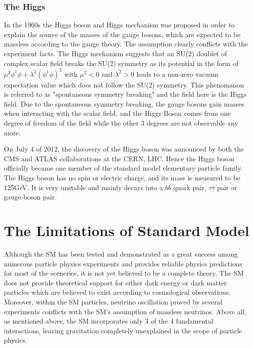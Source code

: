 \subsubsection{The Higgs}
In the 1960s the Higgs boson and Higgs mechanism was proposed in order to explain the source of the masses of the gauge bosons\cite{higgstheory1,higgstheory2,higgstheory3}, which are expected to be massless according to the gauge theory. The assumption clearly conflicts with the experiment facts. The Higgs mechanism suggests that an SU(2) doublet of complex scalar field breaks the SU(2) symmetry as its potential in the form of $\mu^{2}\phi^{\dagger}\phi + \lambda^{2}(\phi^{\dagger}\phi)^2$ with $\mu^{2}<0$ and $\lambda^{2}>0$ leads to a non-zero vacuum expectation value which does not follow the SU(2) symmetry. This phenomanon is referred to as "spontaneous symmetry breaking" and the field here is the Higgs field. Due to the spontaneous symmetry breaking, the gauge bosons gain masses when interacting with the scalar field, and the Higgs Boson comes from one degree of freedom of the field while the other 3 degrees are not observable any more.

\vspace{0.3cm}
On July 4 of 2012, the discovery of the Higgs boson was announced by both the CMS and ATLAS collaborations at the CERN, LHC\cite{higgsdiscover1,higgsdiscover2}. Hence the Higgs boson officially became one member of the standard model elementary particle family. The Higgs boson has no spin or electric charge, and its mass is measured to be 125GeV. It is very unstable and mainly decays into a $b\bar{b}$ quark pair, $\tau\bar{\tau}$ pair or gauge boson pair.

\section{The Limitations of Standard Model}
Although the SM has been tested and demonstrated as a great success among numerous particle physics experiments and provides reliable physics predictions for most of the sceneries, it is not yet believed to be a complete theory. The SM does not provide theoretical support for either dark energy or dark matter particles which are believed to exist according to cosmological observations. Moreover, within the SM particles, neutrino oscillation proved by several experiments conflicts with the SM's assumption of massless neutrinos. Above all, as mentioned above, the SM incorporates only 3 of the 4 fundamental interactions, leaving gravitation completely unexplained in the scope of particle physics.
